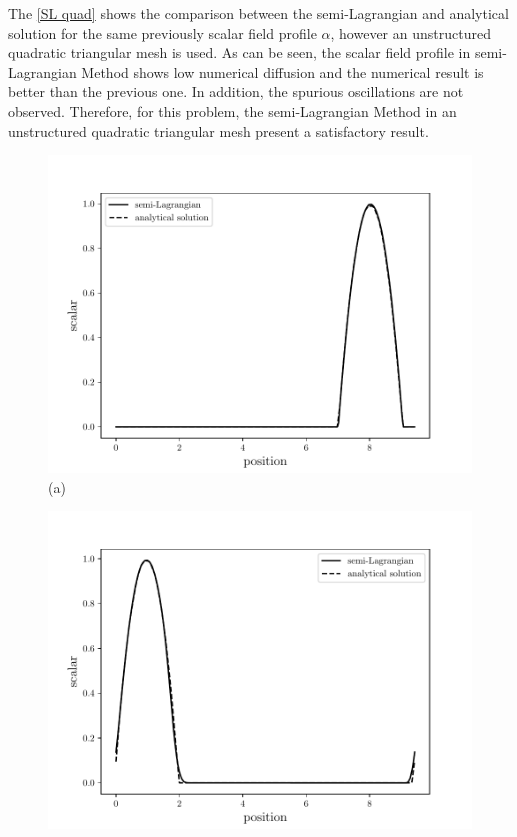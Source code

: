 \medskip
The \ref{SL quad} shows the 
comparison between the semi-Lagrangian and analytical solution
for the same previously scalar field
profile $\alpha$,
however an unstructured quadratic triangular mesh is used.
As can be seen, the scalar field profile in semi-Lagrangian Method
shows low numerical diffusion and 
the numerical result is better than the previous one.
In addition, the spurious oscillations are not observed.
Therefore, for this problem,
the semi-Lagrangian Method in an unstructured quadratic triangular mesh
present a satisfactory result.


\begin{center}
\begin{figure}[H]
     \centering
     \begin{minipage}{.5\linewidth}
      \centering
      \includegraphics[scale=0.53]{./02_chaps/cap_validation/figure/SLquad0.pdf}\\
      (a)
     \end{minipage}%
     \begin{minipage}{.5\linewidth}
      \centering
      \includegraphics[scale=0.53]{./02_chaps/cap_validation/figure/SLquad1.pdf}\\

\end{minipage}
\end{figure}
\end{center}
